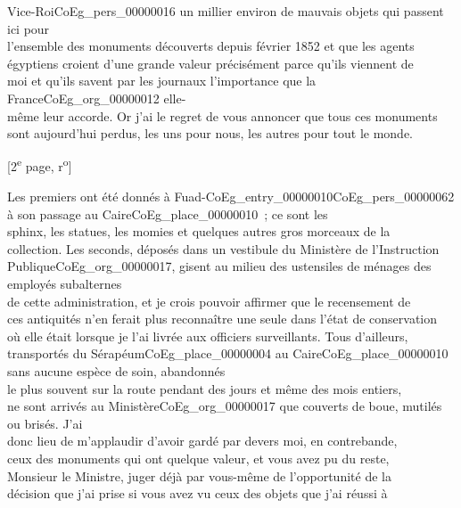 \documentclass{book}
\begin{document}
Vice-Roi\gls{CoEg_pers_00000016} un millier environ de mauvais objets qui passent ici pour\\
l’ensemble des monuments découverts depuis février 1852 et que les agents\\
égyptiens croient d’une grande valeur précisément parce qu’ils viennent de\\
moi et qu’ils savent par les journaux l’importance que la France\gls{CoEg_org_00000012} elle-\\
même leur accorde. Or j’ai le regret de vous annoncer que tous ces monuments\\
sont aujourd’hui perdus, les uns pour nous, les autres pour tout le monde.
{\footnotesize\begin{center} {[2\textsuperscript{e} page, r\textsuperscript{o}]}\end{center}}
\noindent Les premiers ont été donnés à Fuad-\gls{CoEg_entry_00000010}\gls{CoEg_pers_00000062} à son passage au Caire\gls{CoEg_place_00000010}~; ce sont les\\
sphinx, les statues, les momies et quelques autres gros morceaux de la\\
collection. Les seconds, déposés dans un vestibule du Ministère de l’Instruction\\
Publique\gls{CoEg_org_00000017}, gisent au milieu des ustensiles de ménages des employés subalternes\\
de cette administration, et je crois pouvoir affirmer que le recensement de\\
ces antiquités n’en ferait plus reconnaître une seule dans l’état de conservation\\
où elle était lorsque je l’ai livrée aux officiers surveillants. Tous d’ailleurs,\\
transportés du Sérapéum\gls{CoEg_place_00000004} au Caire\gls{CoEg_place_00000010} sans aucune espèce de soin, abandonnés\\
le plus souvent sur la route pendant des jours et même des mois entiers,\\
ne sont arrivés au Ministère\gls{CoEg_org_00000017} que couverts de boue, mutilés ou brisés. J’ai\\
donc lieu de m’applaudir d’avoir gardé par devers moi, en contrebande,\\
ceux des monuments qui ont quelque valeur, et vous avez pu du reste,\\
Monsieur le Ministre, juger déjà par vous-même de l’opportunité de la\\
décision que j’ai prise si vous avez vu ceux des objets que j’ai réussi à\\
\end{document}

